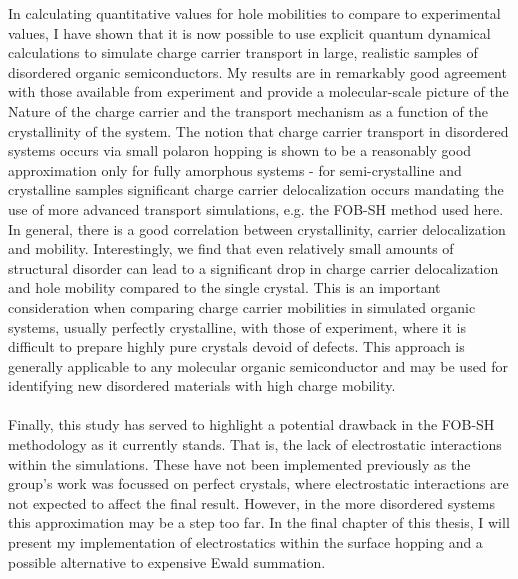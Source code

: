 In calculating quantitative values for hole mobilities to compare to experimental values, I have shown that it is now possible to use explicit quantum dynamical calculations to simulate charge carrier transport in large, realistic samples of disordered organic semiconductors. My results are in remarkably good agreement with those available from experiment and provide a molecular-scale picture of the Nature of the charge carrier and the transport mechanism as a function of the crystallinity of the system. The notion that charge carrier transport in disordered systems occurs via small polaron hopping is shown to be a reasonably good approximation only for fully amorphous systems - for semi-crystalline and crystalline samples significant charge carrier delocalization occurs mandating the use of more advanced transport simulations, e.g.  the FOB-SH method used here. In general, there is a good correlation between crystallinity, carrier delocalization and mobility.  Interestingly, we find that even relatively small amounts of structural disorder can lead to a significant drop in charge carrier delocalization and hole mobility compared to the single crystal. This is an important consideration when comparing charge carrier mobilities in simulated organic systems, usually perfectly crystalline, with those of experiment, where it is difficult to prepare highly pure crystals devoid of defects. This approach is generally applicable to any molecular organic semiconductor and may be used for identifying new disordered materials with high charge mobility. 
\\\\
Finally, this study has served to highlight a potential drawback in the FOB-SH methodology as it currently stands. That is, the lack of electrostatic interactions within the simulations. These have not been implemented previously as the group's work was focussed on perfect crystals, where electrostatic interactions are not expected to affect the final result. However, in the more disordered systems this approximation may be a step too far. In the final chapter of this thesis, I will present my implementation of electrostatics within the surface hopping and a possible alternative to expensive Ewald summation.



